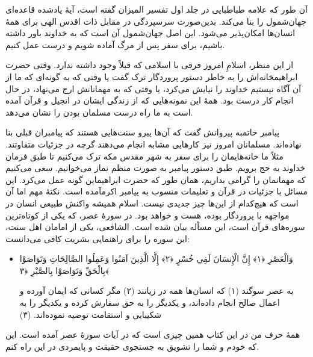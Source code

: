 آن طور که علامه طباطبایی در جلد اول تفسیر المیزان گفته است، آیهٔ یادشده قاعده‌ای جهان‌شمول را بنا می‌کند. بدین‌صورت  سرسپردگی در مقابل ذات اقدس الهی برای همهٔ انسان‌ها امکان‌پذیر می‌شود. این اصل جهان‌شمول آن است که به خداوند باور داشته باشیم، برای سفر پس از مرگ آماده شویم و درست عمل کنیم.

از این منظر، اسلامِ امروز فرقی با اسلامی که قبلاً وجود داشته ندارد. وقتی حضرت ابراهیم{}خانه‌اش را به خاطر دستور پروردگار ترک گفت یا وقتی که به گونه‌ای که ما از آن آگاه نیستیم خداوند را  نیایش می‌کرد، یا وقتی که به مهمانانش ارج می‌نهاد، در حال انجام کار درست بود. همهٔ این نمونه‌هایی که از زندگی ایشان در انجیل و قرآن آمده است به ما راه درست مسلمان بودن را نشان می‌دهد.

پیامبر خاتم{}به پیروانش گفت که آن‌ها پیرو سنت‌هایی هستند که پیامبران قبلی بنا نهاده‌اند. مسلمانان امروز نیز کارهایی مشابه انجام می‌دهند گرچه در جزئیات متفاوتند. مثلاً ما خانه‌هایمان را برای سفر به شهر مقدس مکه ترک می‌کنیم تا طبق فرمان خداوند به حج برویم. طبق دستور پیامبر{} به صورت منظم نماز می‌خوانیم.  سعی می‌کنیم که مهمانمان را گرامی بداریم، همان طور که حضرت ابراهیم{}این گونه عمل می‌کرد. این مسائل با جزئیات در قرآن و تعلیمات منسوب به پیامبر اکرم{}آمده است. نکتهٔ مهم اما آن است که هیچ‌کدام از این‌ها چیز جدیدی نیست. اسلام همیشه واکنش طبیعی انسان در مواجهه با پروردگار بوده، هست و خواهد بود. در سوره‌ٔ عصر، که یکی از کوتاه‌ترین سوره‌های قرآن است، این مسأله بیان شده است. الشافعی، یکی از امامان  اهل سنت، این سوره را برای راهنمایی بشریت کافی می‌دانست:

\begin{itemize}
	\item[]
	{
		
		وَالْعَصْرِ ﴿١﴾ إِنَّ الْإِنسَانَ لَفِي خُسْرٍ ﴿٢﴾ إِلَّا الَّذِينَ آمَنُوا وَعَمِلُوا الصَّالِحَاتِ وَتَوَاصَوْا بِالْحَقِّ وَتَوَاصَوْا بِالصَّبْرِ ﴿٣﴾}
	
	{
		به عصر سوگند (۱) که انسان‌ها همه در زیانند (۲) مگر کسانی که ایمان آورده و اعمال صالح انجام داده‌اند، و یکدیگر را به حق سفارش کرده و یکدیگر را به شکیبایی و استقامت توصیه نموده‌اند. (۳)}
\end{itemize}

همهٔ حرف من در این کتاب همین چیزی است که در آیات سورهٔ عصر آمده است. این که خودم و شما را تشویق به جستجوی حقیقت و پایمردی در این راه کنم.  

